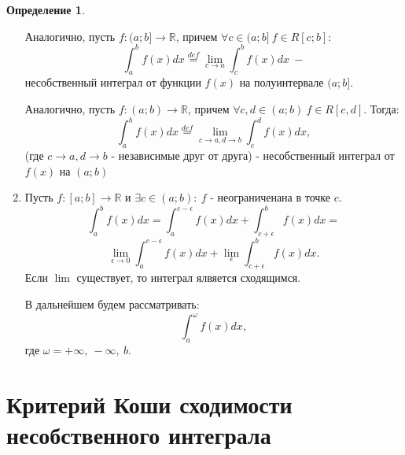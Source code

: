 \documentclass{report}
\theoremstyle{definition}
\newtheorem*{definition}{Определение}
\begin{document}
\begin{definition}
\begin{enumerate}
                                  Аналогично, пусть $f:(a;b]\rightarrow\mathbb{R}$, причем $\forall c \in (a;b] \ f\in R[c;b]$:
              \begin{equation*}
                  \int_{a}^{b}f(x)dx \overset{def}{=} \underset{c\rightarrow a}{\lim}\int_{c}^{b}f(x)dx \ -
              \end{equation*}
              несобственный интеграл от функции $f(x)$ на полуинтервале $(a;b]$.

              Аналогично, пусть $f:(a;b)\rightarrow\mathbb{R}$, причем $\forall c,d \in (a;b) \ f\in R[c,d]$.
              Тогда:
              \begin{equation*}
                  \int_{a}^{b}f(x)dx \overset{def}{=} \underset{c\rightarrow a,d\rightarrow b}{\lim}\int_{c}^{d}
                  f(x)dx,
              \end{equation*}
              (где $c\rightarrow a,d\rightarrow b$ - независимые друг от друга) - несобственный интеграл от $f(x)$
              на $(a;b)$

        \item Пусть $f:[a;b]\rightarrow\mathbb{R}$ и $\exists c \in (a;b): \ f$ - неограниченана в точке $c$.
              \begin{equation*}
                  \int_{a}^{b} f(x) dx = \int_{a}^{c - \epsilon} f(x)dx + \int_{c+\epsilon}^{b}f(x)dx =
              \end{equation*}
              \begin{equation*}
                  \underset{\epsilon\rightarrow0}{\lim}\int_{a}^{c - \epsilon} f(x)dx + \underset{\epsilon}{\lim}
                  \int_{c+\epsilon}^{b}f(x)dx.
              \end{equation*}
              Если $\lim$ существует, то интеграл ялвяется сходящимся.

              В дальнейшем будем рассматривать:
              \begin{equation*}
                  \int_{a}^{\omega}f(x)dx,
              \end{equation*}
              где $\omega = +\infty, \ -\infty, \ b$.
    \end{enumerate}
\end{definition}

\section{Критерий Коши сходимости несобственного интеграла}
\end{document}

